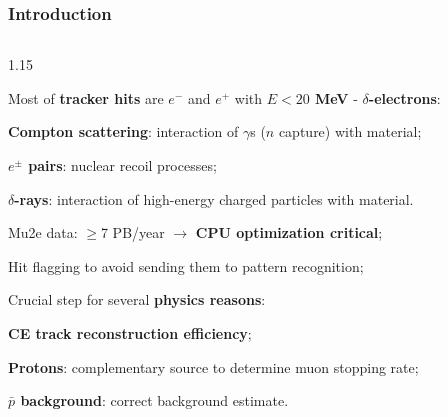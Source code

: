 \documentclass{beamer}
\begin{document}
\begin{frame}
    \frametitle{Introduction}
    \vspace{-3mm}
      \begin{columns}
\begin{column}{1.15\framewidth}
    \setlength{\leftmargini}{1.2em}
    \begin{itemize}
    {\small
        \item Most of \textbf{tracker hits} are $e^-$ and $e^+$ with \textbf{$E<20$ MeV} - \textbf{$\delta$-electrons}:}
        \begin{itemize}
          \vspace{0.8mm}
        {\small
            \item \textbf{Compton scattering}: interaction of $\gamma$s ($n$ capture) with material;
             \vspace{0.8mm}
            \item \textbf{$e^\pm$ pairs}: nuclear recoil processes;
                 \vspace{0.8mm}
            \item \textbf{$\delta$-rays}: interaction of high-energy charged particles with material.}
        \end{itemize}
             \vspace{1.3mm}
       {\small \item Mu2e data: $\geq$7 PB/year $\rightarrow$ \textbf{CPU optimization critical};
            \vspace{1.3mm}
        \item Hit flagging to avoid sending them to pattern recognition;
             \vspace{1.3mm}
        \item Crucial step for several \textbf{physics reasons}:}
               \vspace{0.8mm}
        \begin{itemize}
        {\small
            \item \textbf{CE track reconstruction efficiency};
                 \vspace{0.8mm}
            \item \textbf{Protons}: complementary source to determine muon stopping rate;
                 \vspace{0.8mm}
            \item \textbf{$\bar{p}$ background}: correct background estimate.}
                  \vspace{1.3mm}
    \end{itemize}

\end{itemize}
\end{column}
\end{columns}
\end{frame}
\end{document}
